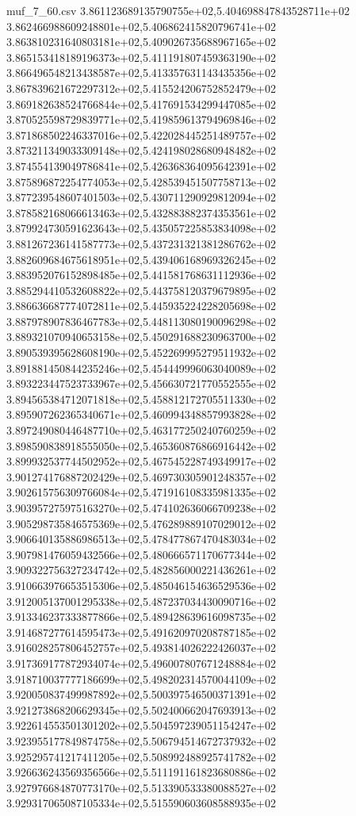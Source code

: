 \begin{filecontents*}{muf_7_60.csv}
3.861123689135790755e+02,5.404698847843528711e+02
3.862466988609248801e+02,5.406862415820796741e+02
3.863810231640803181e+02,5.409026735688967165e+02
3.865153418189196373e+02,5.411191807459363190e+02
3.866496548213438587e+02,5.413357631143435356e+02
3.867839621672297312e+02,5.415524206752852479e+02
3.869182638524766844e+02,5.417691534299447085e+02
3.870525598729839771e+02,5.419859613794969846e+02
3.871868502246337016e+02,5.422028445251489757e+02
3.873211349033309148e+02,5.424198028680948482e+02
3.874554139049786841e+02,5.426368364095642391e+02
3.875896872254774053e+02,5.428539451507758713e+02
3.877239548607401503e+02,5.430711290929812094e+02
3.878582168066613463e+02,5.432883882374353561e+02
3.879924730591623643e+02,5.435057225853834098e+02
3.881267236141587773e+02,5.437231321381286762e+02
3.882609684675618951e+02,5.439406168969326245e+02
3.883952076152898485e+02,5.441581768631112936e+02
3.885294410532608822e+02,5.443758120379679895e+02
3.886636687774072811e+02,5.445935224228205698e+02
3.887978907836467783e+02,5.448113080190096298e+02
3.889321070940653158e+02,5.450291688230963700e+02
3.890539395628608190e+02,5.452269995279511932e+02
3.891881450844235246e+02,5.454449996063040089e+02
3.893223447523733967e+02,5.456630721770552555e+02
3.894565384712071818e+02,5.458812172705511330e+02
3.895907262365340671e+02,5.460994348857993828e+02
3.897249080446487710e+02,5.463177250240760259e+02
3.898590838918555050e+02,5.465360876866916442e+02
3.899932537744502952e+02,5.467545228749349917e+02
3.901274176887202429e+02,5.469730305901248357e+02
3.902615756309766084e+02,5.471916108335981335e+02
3.903957275975163270e+02,5.474102636066709238e+02
3.905298735846575369e+02,5.476289889107029012e+02
3.906640135886986513e+02,5.478477867470483034e+02
3.907981476059432566e+02,5.480666571170677344e+02
3.909322756327234742e+02,5.482856000221436261e+02
3.910663976653515306e+02,5.485046154636529536e+02
3.912005137001295338e+02,5.487237034430090716e+02
3.913346237333877866e+02,5.489428639616098735e+02
3.914687277614595473e+02,5.491620970208787185e+02
3.916028257806452757e+02,5.493814026222426037e+02
3.917369177872934074e+02,5.496007807671248884e+02
3.918710037777186699e+02,5.498202314570044109e+02
3.920050837499987892e+02,5.500397546500371391e+02
3.921273868206629345e+02,5.502400662047693913e+02
3.922614553501301202e+02,5.504597239051154247e+02
3.923955177849874758e+02,5.506794514672737932e+02
3.925295741217411205e+02,5.508992488925741782e+02
3.926636243569356566e+02,5.511191161823680886e+02
3.927976684870773170e+02,5.513390533380088527e+02
3.929317065087105334e+02,5.515590603608588935e+02

\end{filecontents*}
